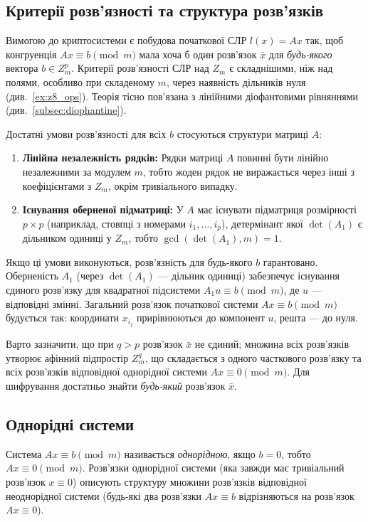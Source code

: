 \subsection{Критерії розв'язності та структура розв'язків}
\label{subsec:sle_solvability_rings}
Вимогою до криптосистеми є побудова початкової СЛР $l(x) = Ax$ так, щоб конгруенція $Ax \equiv b \pmod{m}$ мала хоча б один розв'язок $\bar{x}$ для \emph{будь-якого} вектора $b \in Z_m^p$.
Критерії розв'язності СЛР над $Z_m$ є складнішими, ніж над полями, особливо при складеному $m$, через наявність дільників нуля (див.~\ref{ex:z8_ops}).
Теорія тісно пов'язана з лінійними діофантовими рівняннями (див.~\ref{subsec:diophantine}).

Достатні умови розв'язності для всіх $b$ стосуються структури матриці $A$:
\begin{enumerate}
    \item \textbf{Лінійна незалежність рядків:} Рядки матриці $A$ повинні бути лінійно незалежними за модулем $m$, тобто жоден рядок не виражається через інші з коефіцієнтами з $Z_m$, окрім тривіального випадку.
    \item \textbf{Існування оберненої підматриці:} У $A$ має існувати підматриця розмірності $p \times p$ (наприклад, стовпці з номерами $i_1, \ldots, i_p$), детермінант якої $\det(A_1)$ є дільником одиниці у $Z_m$, тобто $\gcd(\det(A_1), m) = 1$.
\end{enumerate}
Якщо ці умови виконуються, розв'язність для будь-якого $b$ гарантовано.
Оберненість $A_1$ (через $\det(A_1)$ — дільник одиниці) забезпечує існування єдиного розв'язку для квадратної підсистеми $A_1 u \equiv b \pmod{m}$, де $u$ — відповідні змінні.
Загальний розв'язок початкової системи $Ax \equiv b \pmod{m}$ будується так: координати $x_{i_j}$ прирівнюються до компонент $u$, решта — до нуля.

Варто зазначити, що при $q > p$ розв'язок $\bar{x}$ не єдиний; множина всіх розв'язків утворює афінний підпростір $Z_m^q$, що складається з одного часткового розв'язку та всіх розв'язків відповідної однорідної системи $Ax \equiv 0 \pmod{m}$.
Для шифрування достатньо знайти \emph{будь-який} розв'язок $\bar{x}$.

\subsection{Однорідні системи}
\label{subsec:sle_homogeneous}
Система $Ax \equiv b \pmod{m}$ називається \emph{однорідною}, якщо $b = 0$, тобто $Ax \equiv 0 \pmod{m}$.
Розв'язки однорідної системи (яка завжди має тривіальний розв'язок $x \equiv 0$) описують структуру множини розв'язків відповідної неоднорідної системи (будь-які два розв'язки $Ax \equiv b$ відрізняються на розв'язок $Ax \equiv 0$).

